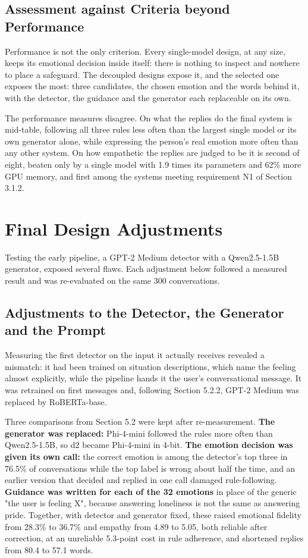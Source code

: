 \subsection{Assessment against Criteria beyond Performance}
\label{sec:5.2.6}

Performance is not the only criterion. Every single-model design, at any size, keeps its emotional decision inside itself: there is nothing to inspect and nowhere to place a safeguard. The decoupled designs expose it, and the selected one exposes the most: three candidates, the chosen emotion and the words behind it, with the detector, the guidance and the generator each replaceable on its own.

The performance measures disagree. On what the replies do the final system is mid-table, following all three rules less often than the largest single model or its own generator alone, while expressing the person's real emotion more often than any other system. On how empathetic the replies are judged to be it is second of eight, beaten only by a single model with 1.9 times its parameters and 62\% more GPU memory, and first among the systems meeting requirement N1 of Section 3.1.2.

\section{Final Design Adjustments}
\label{sec:5.3}

Testing the early pipeline, a GPT-2 Medium detector with a Qwen2.5-1.5B generator, exposed several flaws. Each adjustment below followed a measured result and was re-evaluated on the same 300 conversations.

\subsection{Adjustments to the Detector, the Generator and the Prompt}
\label{sec:5.3.1}

Measuring the first detector on the input it actually receives revealed a mismatch: it had been trained on situation descriptions, which name the feeling almost explicitly, while the pipeline hands it the user's conversational message. It was retrained on first messages and, following Section 5.2.2, GPT-2 Medium was replaced by RoBERTa-base.

Three comparisons from Section 5.2 were kept after re-measurement. \textbf{The generator was replaced:} Phi-4-mini followed the rules more often than Qwen2.5-1.5B, so d2 became Phi-4-mini in 4-bit.\textbf{ The emotion decision was given its own call: }the correct emotion is among the detector's top three in 76.5\% of conversations while the top label is wrong about half the time, and an earlier version that decided and replied in one call damaged rule-following. \textbf{Guidance was written for each of the 32 emotions} in place of the generic "the user is feeling X", because answering loneliness is not the same as answering pride. Together, with detector and generator fixed, these raised emotional fidelity from 28.3\% to 36.7\% and empathy from 4.89 to 5.05, both reliable after correction, at an unreliable 5.3-point cost in rule adherence, and shortened replies from 80.4 to 57.1 words.

